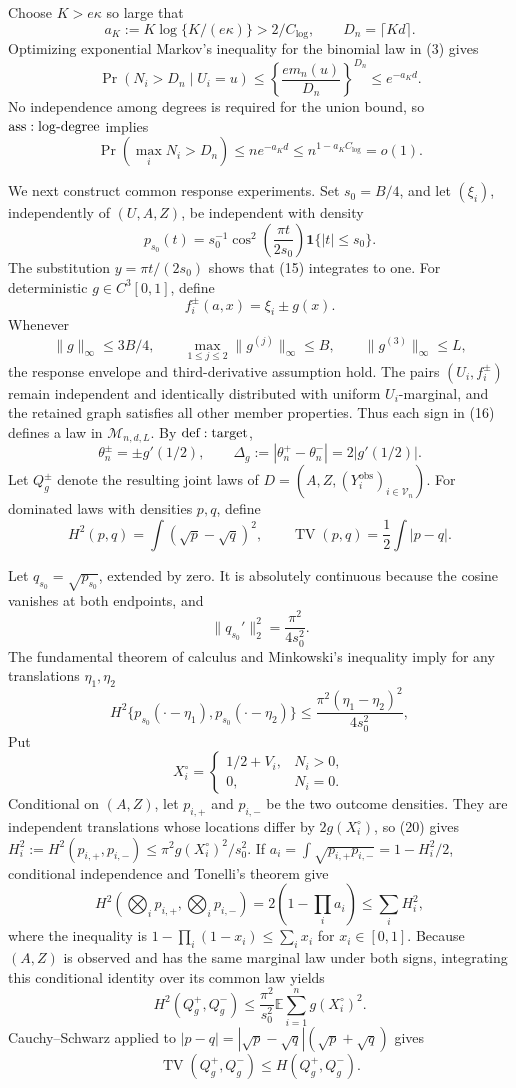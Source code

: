 Choose \(K>e\kappa\) so large that
\[
 a_K:=K\log\{K/(e\kappa)\}>2/C_{\log},
 \qquad D_n=\lceil Kd\rceil.
\tag{13}
\]
Optimizing exponential Markov's inequality for the binomial law in (3) gives
\[
 \Pr(N_i>D_n\mid U_i=u)
 \leq\left\{\frac{em_n(u)}{D_n}\right\}^{D_n}
 \leq e^{-a_Kd}.
\]
No independence among degrees is required for the union bound, so \({\rm ass:log\text{-}degree}\) implies
\[
 \Pr\left(\max_iN_i>D_n\right)\leq ne^{-a_Kd}
 \leq n^{1-a_KC_{\log}}=o(1).
\tag{14}
\]

We next construct common response experiments.  Set \(s_0=B/4\), and let \((\xi_i)\), independently of \((U,A,Z)\), be independent with density
\[
 p_{s_0}(t)=s_0^{-1}\cos^2\!\left(\frac{\pi t}{2s_0}\right)
 \mathbf1\{|t|\leq s_0\}.
\tag{15}
\]
The substitution \(y=\pi t/(2s_0)\) shows that (15) integrates to one.  For deterministic \(g\in C^3[0,1]\), define
\[
 f_i^\pm(a,x)=\xi_i\pm g(x).
\tag{16}
\]
Whenever
\[
 \|g\|_\infty\leq3B/4,
 \qquad \max_{1\leq j\leq2}\|g^{(j)}\|_\infty\leq B,
 \qquad \|g^{(3)}\|_\infty\leq L,
\tag{17}
\]
the response envelope and third-derivative assumption hold.  The pairs \((U_i,f_i^\pm)\) remain independent and identically distributed with uniform \(U_i\)-marginal, and the retained graph satisfies all other member properties.  Thus each sign in (16) defines a law in \(\mathcal M_{n,d,L}\).  By \({\rm def:target}\),
\[
 \theta_n^\pm=\pm g'(1/2),
 \qquad \Delta_g:=|\theta_n^+-\theta_n^-|=2|g'(1/2)|.
\tag{18}
\]
Let \(Q_g^\pm\) denote the resulting joint laws of \(D=(A,Z,(Y_i^{\mathrm{obs}})_{i\in\mathcal V_n})\).  For dominated laws with densities \(p,q\), define
\[
 H^2(p,q)=\int(\sqrt p-\sqrt q)^2,
 \qquad \operatorname{TV}(p,q)=\frac12\int|p-q|.
\]

Let \(q_{s_0}=\sqrt{p_{s_0}}\), extended by zero.  It is absolutely continuous because the cosine vanishes at both endpoints, and
\[
 \|q_{s_0}'\|_2^2=\frac{\pi^2}{4s_0^2}.
\tag{19}
\]
The fundamental theorem of calculus and Minkowski's inequality imply for any translations \(\eta_1,\eta_2\)
\[
 H^2\{p_{s_0}(\mathord\cdot-\eta_1),p_{s_0}(\mathord\cdot-\eta_2)\}
 \leq\frac{\pi^2(\eta_1-\eta_2)^2}{4s_0^2},
\tag{20}
\]
Put
\[
 X_i^\circ=\begin{cases}1/2+V_i,&N_i>0,\\0,&N_i=0.\end{cases}
\]
Conditional on \((A,Z)\), let \(p_{i,+}\) and \(p_{i,-}\) be the two outcome densities.  They are independent translations whose locations differ by \(2g(X_i^\circ)\), so (20) gives \(H_i^2:=H^2(p_{i,+},p_{i,-})\leq\pi^2g(X_i^\circ)^2/s_0^2\).  If \(a_i=\int\sqrt{p_{i,+}p_{i,-}}=1-H_i^2/2\), conditional independence and Tonelli's theorem give
\[
 H^2\!\left(\bigotimes_i p_{i,+},\bigotimes_i p_{i,-}\right)
 =2\left(1-\prod_i a_i\right)
 \leq\sum_iH_i^2,
\]
where the inequality is \(1-\prod_i(1-x_i)\leq\sum_i x_i\) for \(x_i\in[0,1]\).  Because \((A,Z)\) is observed and has the same marginal law under both signs, integrating this conditional identity over its common law yields
\[
 H^2(Q_g^+,Q_g^-)
 \leq\frac{\pi^2}{s_0^2}\mathbb E\sum_{i=1}^ng(X_i^\circ)^2.
\tag{21}
\]
Cauchy--Schwarz applied to \(|p-q|=|\sqrt p-\sqrt q|(\sqrt p+\sqrt q)\) gives
\[
 \operatorname{TV}(Q_g^+,Q_g^-)\leq H(Q_g^+,Q_g^-).
\tag{22}
\]

